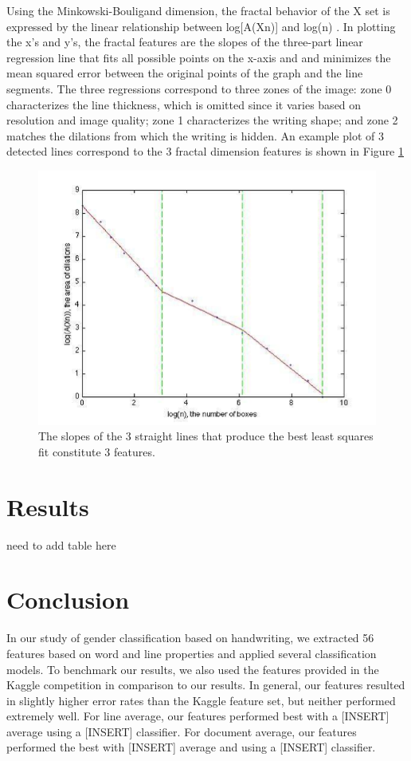 \documentclass[paper=a4, fontsize=11pt]{scrartcl} %
\numberwithin{equation}{section} %
\numberwithin{figure}{section} %
\numberwithin{table}{section} %
\begin{document}
Using the Minkowski-Bouligand dimension, the fractal behavior of the X
set is expressed by the linear relationship between log[A(Xn)] and
log(n) \cite{SyntheticParameters}. In plotting the x's and y's, the
fractal features are the slopes of the three-part linear regression
line that fits all possible points on the x-axis and and minimizes the
mean squared error between the original points of the graph and the
line segments\cite{GeometricalFeatures}.  The three regressions
correspond to three zones of the image: zone 0 characterizes the line
thickness, which is omitted since it varies based on resolution and
image quality; zone 1 characterizes the writing shape; and zone 2
matches the dilations from which the writing is hidden. An example
plot of 3 detected lines correspond to the 3 fractal dimension
features is shown in Figure \ref{fig:fractaldimension}

\begin{figure}
  \includegraphics{fractaldimension.png}
  \caption{The slopes of the 3 straight lines that produce the best
    least squares fit constitute 3 features.}
  \label{fig:fractaldimension}
\end{figure}

\section{Results}
need to add table here
\label{sec:results}
\section{Conclusion}
In our study of gender classification based on handwriting, we
extracted 56 features based on word and line properties and applied
several classification models. To benchmark our results, we also used
the features provided in the Kaggle competition in comparison to our
results. In general, our features resulted in slightly higher error
rates than the Kaggle feature set, but neither performed extremely
well. For line average, our features performed best with a [INSERT]
average using a [INSERT] classifier. For document average, our
features performed the best with [INSERT] average and using a [INSERT]
classifier.
\end{document}
